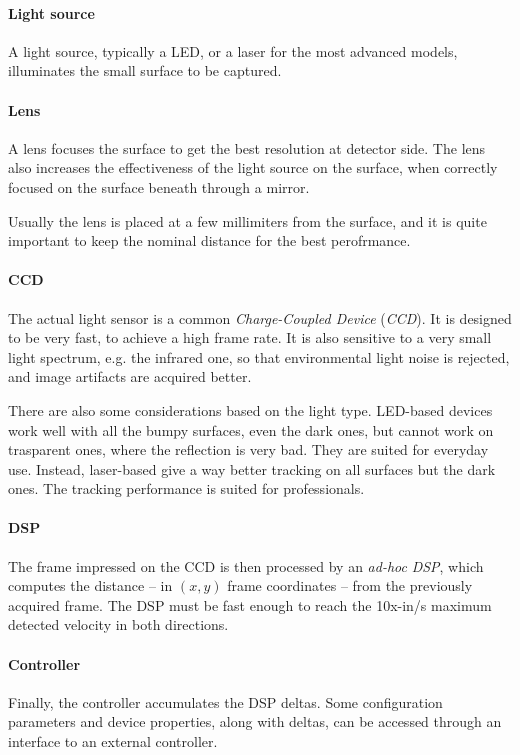 \documentclass[a4paper,10pt]{article}
\begin{document}
\begin{multicols}{2}
\paragraph{Light source}
A light source, typically a LED, or a laser for the most advanced models,
illuminates the small surface to be captured.


\paragraph{Lens}
A lens focuses the surface to get the best resolution at detector side.
The lens also increases the effectiveness of the light source on the surface,
when correctly focused on the surface beneath through a mirror.

Usually the lens is placed at a few millimiters from the surface, and
it is quite important to keep the nominal distance for the best perofrmance.


\paragraph{CCD}
The actual light sensor is a common \emph{Charge-Coupled Device}
(\emph{CCD}). It is designed to be very fast, to achieve a high frame rate.
It is also sensitive to a very small light spectrum, e.g. the infrared one,
so that environmental light noise is rejected, and image artifacts are acquired
better.

There are also some considerations based on the light type. LED-based devices
work well with all the bumpy surfaces, even the dark ones, but cannot work
on trasparent ones, where the reflection is very bad. They are suited for
everyday use.
Instead, laser-based give a way better tracking on all surfaces but the dark
ones. The tracking performance is suited for professionals.


\paragraph{DSP}
The frame impressed on the CCD is then processed by an \textit{ad-hoc}
\emph{DSP}, which computes the distance -- in $(x,y)$ frame coordinates --
from the previously acquired frame. The DSP must be fast enough to reach the
10x-in/s maximum detected velocity in both directions.


\paragraph{Controller}
Finally, the controller accumulates the DSP deltas. Some configuration
parameters and device properties, along with deltas, can be accessed through
an interface to an external controller.



\end{multicols}
\end{document}
